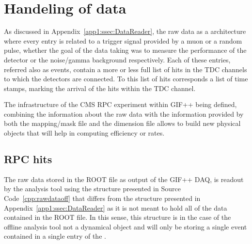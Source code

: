 \section{Handeling of data}
\label{app2:sec:data}

	As discussed in Appendix~\ref{app1:ssec:DataReader}, the raw data as a  architecture where every entry is related to a trigger signal provided by a muon or a random pulse, whether the goal of the data taking was to measure the performance of the detector or the noise/gamma background respectively. Each of these entries, referred also as events, contain a more or less full list of hits in the TDC channels to which the detectors are connected. To this list of hits corresponds a list of time stamps, marking the arrival of the hits within the TDC channel.
	
	The infrastructure of the CMS RPC experiment within GIF++ being defined, combining the information about the raw data with the information provided by both the mapping/mask file and the dimension file allows to build new physical objects that will help in computing efficiency or rates.
	
	\subsection{RPC hits}
	\label{app2:ssec:RPCHit}
	
	The raw data stored in the ROOT file as output of the GIF++ DAQ, is readout by the analysis tool using the structure  presented in Source Code~\ref{cpp:rawdataoff} that differs from the structure presented in Appendix~\ref{app1:ssec:DataReader} as it is not meant to hold all of the data contained in the ROOT file. In this sense, this structure is in the case of the offline analysis tool not a dynamical object and will only be storing a single event contained in a single entry of the .\\
	
